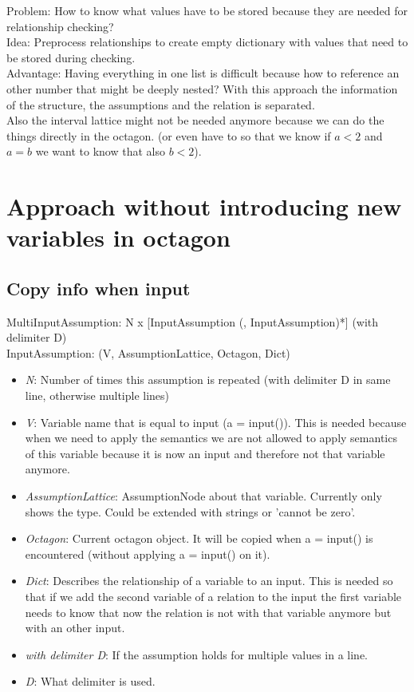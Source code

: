 \documentclass[11pt]{article}
\begin{document}
Problem: How to know what values have to be stored because they are needed for relationship checking?\\
Idea: Preprocess relationships to create empty dictionary with values that need to be stored during checking.\\

Advantage: Having everything in one list is difficult because how to reference an other number that might be deeply nested? With this approach the information of the structure, the assumptions and the relation is separated.\\
Also the interval lattice might not be needed anymore because we can do the things directly in the octagon. (or even have to so that we know if $a < 2$ and $a = b$ we want to know that also $b < 2$).

\section{Approach without introducing new variables in octagon}

\subsection{Copy info when input}

MultiInputAssumption: N x [InputAssumption (, InputAssumption)*] (with delimiter D)\\
InputAssumption: (V, AssumptionLattice, Octagon, Dict)
\begin{itemize}
  \item \textit{N}: Number of times this assumption is repeated (with delimiter D in same line, otherwise multiple lines)
  \item \textit{V}: Variable name that is equal to input (a = input()). This is needed because when we need to apply the semantics we are not allowed to apply semantics of this variable because it is now an input and therefore not that variable anymore.
  \item \textit{AssumptionLattice}: AssumptionNode about that variable. Currently only shows the type. Could be extended with strings or 'cannot be zero'.
  \item \textit{Octagon}: Current octagon object. It will be copied when a = input() is encountered (without applying a = input() on it).
  \item \textit{Dict}: Describes the relationship of a variable to an input. This is needed so that if we add the second variable of a relation to the input the first variable needs to know that now the relation is not with that variable anymore but with an other input.
  \item \textit{with delimiter D}: If the assumption holds for multiple values in a line.
  \item \textit{D}: What delimiter is used.
\end{itemize}
\end{document}
